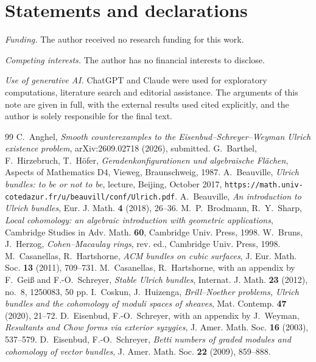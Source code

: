 \documentclass[11pt]{amsart}
\theoremstyle{remark}
\theoremstyle{definition}
\begin{document}
\section*{Statements and declarations}

\noindent\emph{Funding.} The author received no research funding for this work.

\noindent\emph{Competing interests.} The author has no financial interests to disclose.

\noindent\emph{Use of generative AI.} ChatGPT and Claude were used for exploratory computations, literature search and editorial assistance. The arguments of this note are given in full, with the external results used cited explicitly, and the author is solely responsible for the final text.

\begin{thebibliography}{99}
 C.~Anghel, \emph{Smooth counterexamples to the Eisenbud--Schreyer--Weyman Ulrich existence problem}, arXiv:2609.02718 (2026), submitted.
 G.~Barthel, F.~Hirzebruch, T.~H\"ofer, \emph{Geradenkonfigurationen und algebraische Fl\"achen}, Aspects of Mathematics D4, Vieweg, Braunschweig, 1987.
 A.~Beauville, \emph{Ulrich bundles: to be or not to be}, lecture, Beijing, October 2017, \texttt{https://math.univ-cotedazur.fr/u/beauvill/conf/Ulrich.pdf}.
 A.~Beauville, \emph{An introduction to Ulrich bundles}, Eur. J. Math. \textbf{4} (2018), 26--36.
 M.~P.~Brodmann, R.~Y.~Sharp, \emph{Local cohomology: an algebraic introduction with geometric applications}, Cambridge Studies in Adv. Math. \textbf{60}, Cambridge Univ. Press, 1998.
 W.~Bruns, J.~Herzog, \emph{Cohen--Macaulay rings}, rev. ed., Cambridge Univ. Press, 1998.
 M.~Casanellas, R.~Hartshorne, \emph{ACM bundles on cubic surfaces}, J. Eur. Math. Soc. \textbf{13} (2011), 709--731.
 M.~Casanellas, R.~Hartshorne, with an appendix by F.~Gei\ss{} and F.-O.~Schreyer, \emph{Stable Ulrich bundles}, Internat. J. Math. \textbf{23} (2012), no.~8, 1250083, 50 pp.
 I.~Coskun, J.~Huizenga, \emph{Brill--Noether problems, Ulrich bundles and the cohomology of moduli spaces of sheaves}, Mat. Contemp. \textbf{47} (2020), 21--72.
 D.~Eisenbud, F.-O.~Schreyer, with an appendix by J.~Weyman, \emph{Resultants and Chow forms via exterior syzygies}, J. Amer. Math. Soc. \textbf{16} (2003), 537--579.
 D.~Eisenbud, F.-O.~Schreyer, \emph{Betti numbers of graded modules and cohomology of vector bundles}, J. Amer. Math. Soc. \textbf{22} (2009), 859--888.

\end{thebibliography}
\end{document}
